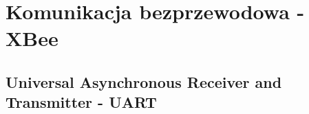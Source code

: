 \section{Komunikacja bezprzewodowa - XBee} \label{sec:xbee}
\subsection{Universal Asynchronous Receiver and Transmitter - UART} \label{ssec:uart}